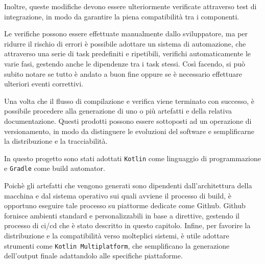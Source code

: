 \documentclass[12pt,a4paper,openright,twoside]{book}
\begin{document}
Inoltre, queste modifiche devono essere ulteriormente 
verificate attraverso test di integrazione, in modo da garantire la piena
compatibilità tra i componenti. 

Le verifiche possono essere effettuate 
manualmente dallo sviluppatore, ma per ridurre il rischio di errori è
possibile adottare un sistema di automazione, che attraverso una serie di task predefiniti
e ripetibili, verifichi automaticamente le varie fasi,
gestendo anche le dipendenze tra i task stessi.
Così facendo, si può subito notare se tutto è andato a buon fine oppure 
se è necessario effettuare ulteriori eventi correttivi.

Una volta che il flusso di compilazione e verifica viene terminato con successo,
è possibile procedere alla generazione di uno o più artefatti e della relativa documentazione.
Questi prodotti possono essere sottoposti ad un operazione di versionamento,
in modo da distinguere le evoluzioni del software e semplificarne la distribuzione
e la tracciabilità.

In questo progetto sono stati adottati \texttt{Kotlin} come linguaggio di programmazione
e \texttt{Gradle} come build automator.

Poichè gli artefatti che vengono generati sono dipendenti dall'architettura della macchina
e dal sistema operativo sui quali avviene il processo di build, è opportuno eseguire tale processo
su piattorme dedicate come Github.
Github fornisce ambienti standard e personalizzabili
in base a direttive, gestendo il processo di \ac{ci}/\ac{cd} che è stato descritto in questo capitolo. 
Infine, per favorire la distribuzione e la compatibilità verso molteplici sistemi,
è utile adottare strumenti come \texttt{Kotlin Multiplatform},
che semplificano la generazione dell'output finale adattandolo alle specifiche piattaforme. 
\end{document}
